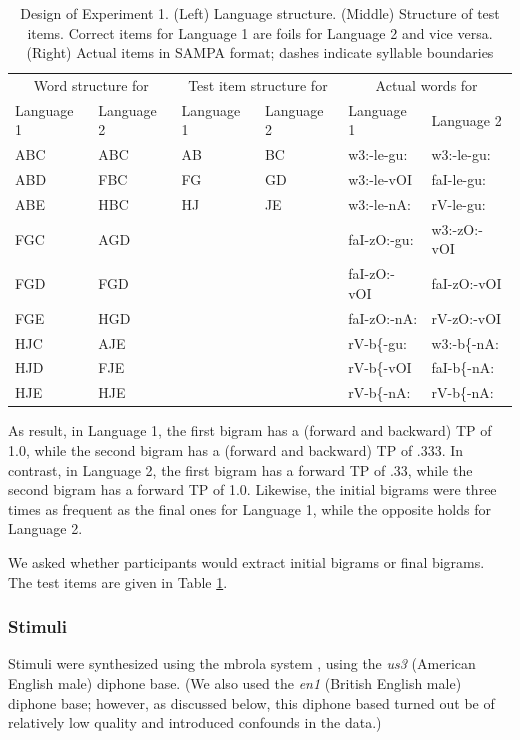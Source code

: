 \documentclass[]{article}
\begin{document}
\begin{table}

\caption{\label{tab:stats-london-print-language-structure}Design of Experiment 1. (Left) Language structure. (Middle) Structure of test items. Correct items for Language 1 are foils for Language 2 and vice versa. (Right) Actual items in SAMPA format; dashes indicate syllable boundaries}
\centering
\begin{tabular}[t]{llllll}
\toprule
\multicolumn{2}{c}{Word structure for} & \multicolumn{2}{c}{Test item structure for} & \multicolumn{2}{c}{Actual words for} \\
Language 1 & Language 2 & Language 1 & Language 2 & Language 1 & Language 2\\
\midrule
ABC & ABC & AB & BC & w3:-le-gu: & w3:-le-gu:\\
ABD & FBC & FG & GD & w3:-le-vOI & faI-le-gu:\\
ABE & HBC & HJ & JE & w3:-le-nA: & rV-le-gu:\\
FGC & AGD &  &  & faI-zO:-gu: & w3:-zO:-vOI\\
FGD & FGD &  &  & faI-zO:-vOI & faI-zO:-vOI\\
\addlinespace
FGE & HGD &  &  & faI-zO:-nA: & rV-zO:-vOI\\
HJC & AJE &  &  & rV-b\{-gu: & w3:-b\{-nA:\\
HJD & FJE &  &  & rV-b\{-vOI & faI-b\{-nA:\\
HJE & HJE &  &  & rV-b\{-nA: & rV-b\{-nA:\\
\bottomrule
\end{tabular}
\end{table}

As result, in Language 1, the first bigram has a (forward and backward)
TP of 1.0, while the second bigram has a (forward and backward) TP of
.333. In contrast, in Language 2, the first bigram has a forward TP of
.33, while the second bigram has a forward TP of 1.0. Likewise, the
initial bigrams were three times as frequent as the final ones for
Language 1, while the opposite holds for Language 2.

We asked whether participants would extract initial bigrams or final
bigrams. The test items are given in Table
\ref{tab:stats-london-print-language-structure}.

\subsubsection{Stimuli}\label{stimuli}

Stimuli were synthesized using the mbrola system \citep{mbrola}, using
the \emph{us3} (American English male) diphone base. (We also used the
\emph{en1} (British English male) diphone base; however, as discussed
below, this diphone based turned out be of relatively low quality and
introduced confounds in the data.)
\end{document}
